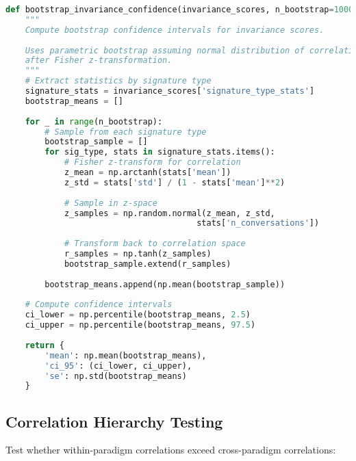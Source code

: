 \documentclass[11pt,letterpaper]{article}
\begin{document}
\begin{lstlisting}[language=Python]
def bootstrap_invariance_confidence(invariance_scores, n_bootstrap=10000):
    """
    Compute bootstrap confidence intervals for invariance scores.
    
    Uses parametric bootstrap assuming normal distribution of correlations
    after Fisher z-transformation.
    """
    # Extract statistics by signature type
    signature_stats = invariance_scores['signature_type_stats']
    bootstrap_means = []
    
    for _ in range(n_bootstrap):
        # Sample from each signature type
        bootstrap_sample = []
        for sig_type, stats in signature_stats.items():
            # Fisher z-transform for correlation
            z_mean = np.arctanh(stats['mean'])
            z_std = stats['std'] / (1 - stats['mean']**2)
            
            # Sample in z-space
            z_samples = np.random.normal(z_mean, z_std, 
                                       stats['n_conversations'])
            
            # Transform back to correlation space
            r_samples = np.tanh(z_samples)
            bootstrap_sample.extend(r_samples)
        
        bootstrap_means.append(np.mean(bootstrap_sample))
    
    # Compute confidence intervals
    ci_lower = np.percentile(bootstrap_means, 2.5)
    ci_upper = np.percentile(bootstrap_means, 97.5)
    
    return {
        'mean': np.mean(bootstrap_means),
        'ci_95': (ci_lower, ci_upper),
        'se': np.std(bootstrap_means)
    }
\end{lstlisting}

\subsection{Correlation Hierarchy Testing}
\label{app:correlation-hierarchy-testing}

Test whether within-paradigm correlations exceed cross-paradigm correlations:
\end{document}
